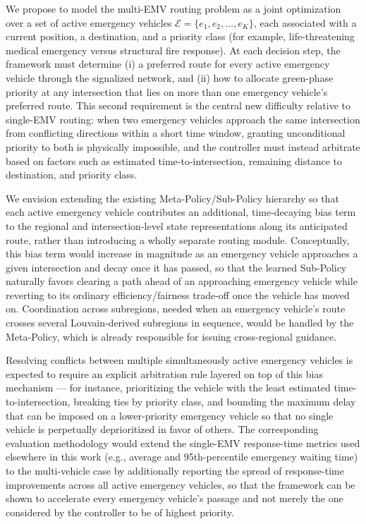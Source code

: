 \documentclass[3p,times]{elsarticle}
\theoremstyle{plain}
\theoremstyle{definition}
\begin{document}
We propose to model the multi-EMV routing problem as a joint
optimization over a set of active emergency vehicles
$\mathcal{E} = \{e_1, e_2, \dots, e_K\}$, each associated with a
current position, a destination, and a priority class (for example,
life-threatening medical emergency versus structural fire response).
At each decision step, the framework must determine (i) a preferred
route for every active emergency vehicle through the signalized
network, and (ii) how to allocate green-phase priority at any
intersection that lies on more than one emergency vehicle's preferred
route. This second requirement is the central new difficulty relative
to single-EMV routing: when two emergency vehicles approach the same
intersection from conflicting directions within a short time window,
granting unconditional priority to both is physically impossible, and
the controller must instead arbitrate based on factors such as
estimated time-to-intersection, remaining distance to destination, and
priority class.

We envision extending the existing Meta-Policy/Sub-Policy hierarchy so
that each active emergency vehicle contributes an additional,
time-decaying bias term to the regional and intersection-level state
representations along its anticipated route, rather than introducing a
wholly separate routing module. Conceptually, this bias term would
increase in magnitude as an emergency vehicle approaches a given
intersection and decay once it has passed, so that the learned
Sub-Policy naturally favors clearing a path ahead of an approaching
emergency vehicle while reverting to its ordinary efficiency/fairness
trade-off once the vehicle has moved on. Coordination across
subregions, needed when an emergency vehicle's route crosses several
Louvain-derived subregions in sequence, would be handled by the
Meta-Policy, which is already responsible for issuing cross-regional
guidance.

Resolving conflicts between multiple simultaneously active emergency
vehicles is expected to require an explicit arbitration rule layered
on top of this bias mechanism --- for instance, prioritizing the
vehicle with the least estimated time-to-intersection, breaking ties
by priority class, and bounding the maximum delay that can be imposed
on a lower-priority emergency vehicle so that no single vehicle is
perpetually deprioritized in favor of others. The corresponding
evaluation methodology would extend the single-EMV response-time
metrics used elsewhere in this work (e.g., average and 95th-percentile
emergency waiting time) to the multi-vehicle case by additionally
reporting the spread of response-time improvements across all active
emergency vehicles, so that the framework can be shown to accelerate
every emergency vehicle's passage and not merely the one considered by
the controller to be of highest priority.
\end{document}
